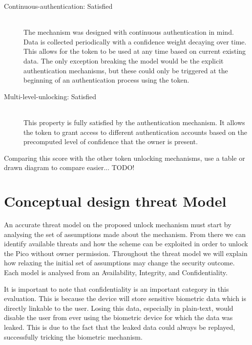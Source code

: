\begin{description}
  \item[Continuous-authentication: Satisfied] \hfill \\
  The mechanism was designed with continuous authentication in mind. Data is collected periodically with a confidence weight decaying over time. This allows for the token to be used at any time based on current existing data. The only exception breaking the model would be the explicit authentication mechanisms, but these could only be triggered at the beginning of an authentication process using the token.
  
  \item[Multi-level-unlocking: Satisfied] \hfill \\
  This property is fully satisfied by the authentication mechanism. It allows the token to grant access to different authentication accounts based on the precomputed level of confidence that the owner is present. 
  
\end{description}

Comparing this score with the other token unlocking mechanisms, use a table or drawn diagram to compare easier... TODO!




\section{Conceptual design threat Model}
An accurate threat model on the proposed unlock mechanism must start by analysing the set of assumptions made about the mechanism. From there we can identify available threats and how the scheme can be exploited in order to unlock the Pico without owner permission. Throughout the threat model we will explain how relaxing the initial set of assumptions may change the security outcome. Each model is analysed from an Availability, Integrity, and Confidentiality.

It is important to note that confidentiality is an important category in this evaluation. This is because the device will store sensitive biometric data which is directly linkable to the user. Losing this data, especially in plain-text, would disable the user from ever using the biometric device for which the data was leaked. This is due to the fact that the leaked data could always be replayed, successfully tricking the biometric mechanism.

